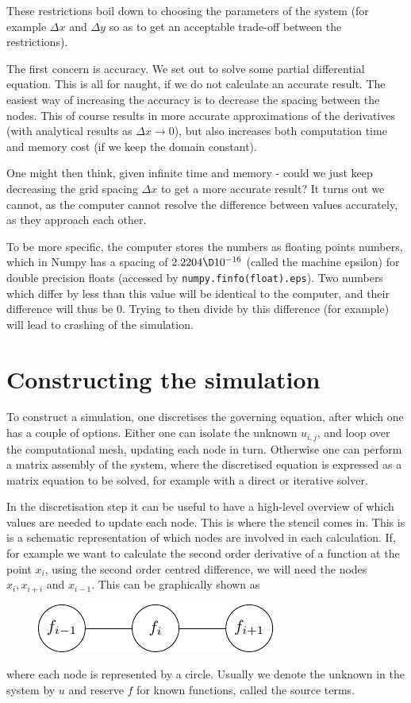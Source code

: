 \documentclass[sigconf]{acmart}
\begin{document}
These restrictions boil down to choosing the parameters of the system (for example $ \Delta x $ and $ \Delta y $ so as to get an acceptable trade-off between the restrictions).

The first concern is accuracy. We set out to solve some partial differential equation. This is all for naught, if we do not calculate an accurate result. The easiest way of increasing the accuracy is to decrease the spacing between the nodes. This of course results in more accurate approximations of the derivatives (with analytical results as $ \Delta x \to 0 $), but also increases both computation time and memory cost (if we keep the domain constant).

One might then think, given infinite time and memory - could we just keep decreasing the grid spacing $ \Delta x $ to get a more accurate result? It turns out we cannot, as the computer cannot resolve the difference between values accurately, as they approach each other.

To be more specific, the computer stores the numbers as floating points numbers, which in Numpy has a spacing of $ 2.2204 \D 10^{-16} $ (called the machine epsilon) for double precision floats (accessed by \texttt{numpy.finfo(float).eps}). Two numbers which differ by less than this value will be identical to the computer, and their difference will thus be 0. Trying to then divide by this difference (for example) will lead to crashing of the simulation.

\section{Constructing the simulation}
To construct a simulation, one discretises the governing equation, after which one has a couple of options. Either one can isolate the unknown $ u_{i,j} $, and loop over the computational mesh, updating each node in turn. Otherwise one can perform a matrix assembly of the system, where the discretised equation is expressed as a matrix equation to be solved, for example with a direct or iterative solver.  

In the discretisation step it can be useful to have a high-level overview of which values are needed to update each node. This is where the stencil comes in. This is is a schematic representation of which nodes are involved in each calculation. If, for example we want to calculate the second order derivative of a function at the point $ x_i $, using the second order centred difference, we will need the nodes $ x_i, x_{i+i} $ and $ x_{i-1} $. This can be graphically shown as
\begin{figure}[H]
	\centering
	\includegraphics{stencil1.pdf}
\end{figure}
where each node is represented by a circle. Usually we denote the unknown in the system by $ u $ and reserve $ f $ for known functions, called the source terms.
\end{document}
